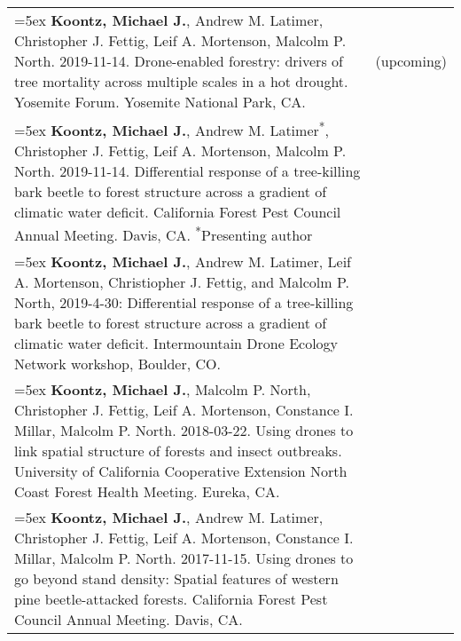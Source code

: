 \documentclass[10pt,english]{article}
\providecommand{\tabularnewline}{\\}
\begin{document}
\renewcommand{\arraystretch}{1.2}
\begin{tabularx}{\textwidth}{@{}>{\raggedright}p{5.25in} >{\raggedleft}X@{}}

\hangindent=5ex \textbf{Koontz, Michael J.}, Andrew M. Latimer, Christopher J. Fettig, Leif A. Mortenson, Malcolm P. North. 2019-11-14. Drone-enabled forestry: drivers of tree mortality across multiple scales in a hot drought. Yosemite Forum. Yosemite National Park, CA. & 2021 (upcoming) \tabularnewline

\hangindent=5ex \textbf{Koontz, Michael J.}, Andrew M. Latimer\textsuperscript{*}, Christopher J. Fettig, Leif A. Mortenson, Malcolm P. North. 2019-11-14. Differential response of a tree-killing bark beetle to forest structure across a gradient of climatic water deficit. California Forest Pest Council Annual Meeting. Davis, CA. \newline \textsuperscript{*}Presenting author & 2019 \tabularnewline

\hangindent=5ex \textbf{Koontz, Michael J.}, Andrew M. Latimer, Leif A. Mortenson, Christiopher J. Fettig, and Malcolm P. North, 2019-4-30: Differential response of a tree-killing bark beetle to forest structure across a gradient of climatic water deficit. Intermountain Drone Ecology Network workshop, Boulder, CO. & 2019 \tabularnewline

\hangindent=5ex \textbf{Koontz, Michael J.}, Malcolm P. North, Christopher J. Fettig, Leif A. Mortenson, Constance I. Millar, Malcolm P. North. 2018-03-22. Using drones to link spatial structure of forests and insect outbreaks. University of California Cooperative Extension North Coast Forest Health Meeting. Eureka, CA. & 2018 \tabularnewline

\hangindent=5ex \textbf{Koontz, Michael J.}, Andrew M. Latimer, Christopher J. Fettig, Leif A. Mortenson, Constance I. Millar, Malcolm P. North. 2017-11-15. Using drones to go beyond stand density: Spatial features of western pine beetle-attacked forests. California Forest Pest Council Annual Meeting. Davis, CA. & 2017

\end{tabularx}
\vspace{1ex}



%
%
\end{document}
